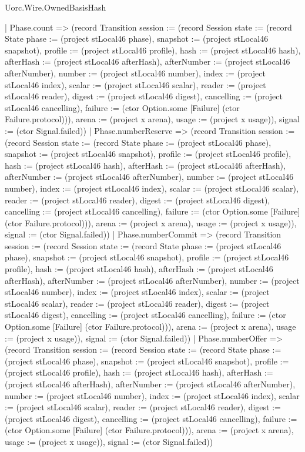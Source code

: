 \begin{lexlean}{Uorc.Wire.OwnedBasisHash}
\begin{semanticmodule}
{      | Phase.count => (record Transition {session := (record Session {state := (record State {phase := (project stLocal46 phase), snapshot := (project stLocal46 snapshot), profile := (project stLocal46 profile), hash := (project stLocal46 hash), afterHash := (project stLocal46 afterHash), afterNumber := (project stLocal46 afterNumber), number := (project stLocal46 number), index := (project stLocal46 index), scalar := (project stLocal46 scalar), reader := (project stLocal46 reader), digest := (project stLocal46 digest), cancelling := (project stLocal46 cancelling), failure := (ctor Option.some [Failure] (ctor Failure.protocol))}), arena := (project x arena), usage := (project x usage)}), signal := (ctor Signal.failed)})
      | Phase.numberReserve => (record Transition {session := (record Session {state := (record State {phase := (project stLocal46 phase), snapshot := (project stLocal46 snapshot), profile := (project stLocal46 profile), hash := (project stLocal46 hash), afterHash := (project stLocal46 afterHash), afterNumber := (project stLocal46 afterNumber), number := (project stLocal46 number), index := (project stLocal46 index), scalar := (project stLocal46 scalar), reader := (project stLocal46 reader), digest := (project stLocal46 digest), cancelling := (project stLocal46 cancelling), failure := (ctor Option.some [Failure] (ctor Failure.protocol))}), arena := (project x arena), usage := (project x usage)}), signal := (ctor Signal.failed)})
      | Phase.numberCommit => (record Transition {session := (record Session {state := (record State {phase := (project stLocal46 phase), snapshot := (project stLocal46 snapshot), profile := (project stLocal46 profile), hash := (project stLocal46 hash), afterHash := (project stLocal46 afterHash), afterNumber := (project stLocal46 afterNumber), number := (project stLocal46 number), index := (project stLocal46 index), scalar := (project stLocal46 scalar), reader := (project stLocal46 reader), digest := (project stLocal46 digest), cancelling := (project stLocal46 cancelling), failure := (ctor Option.some [Failure] (ctor Failure.protocol))}), arena := (project x arena), usage := (project x usage)}), signal := (ctor Signal.failed)})
      | Phase.numberOffer => (record Transition {session := (record Session {state := (record State {phase := (project stLocal46 phase), snapshot := (project stLocal46 snapshot), profile := (project stLocal46 profile), hash := (project stLocal46 hash), afterHash := (project stLocal46 afterHash), afterNumber := (project stLocal46 afterNumber), number := (project stLocal46 number), index := (project stLocal46 index), scalar := (project stLocal46 scalar), reader := (project stLocal46 reader), digest := (project stLocal46 digest), cancelling := (project stLocal46 cancelling), failure := (ctor Option.some [Failure] (ctor Failure.protocol))}), arena := (project x arena), usage := (project x usage)}), signal := (ctor Signal.failed)})
}
\end{semanticmodule}
\end{lexlean}
